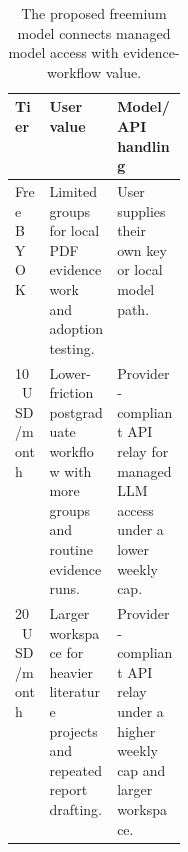 \begin{table}[t]
  \caption{The proposed freemium model connects managed model access with evidence-workflow value.}
  \label{tab:revenue-model}
  \centering
  \small
  \setlength{\tabcolsep}{4pt}
  \begin{tabularx}{\linewidth}{p{0.2\linewidth}YY}
    \toprule
    Tier & User value & Model/API handling \\
    \midrule
    Free BYOK & Limited groups for local PDF evidence work and adoption testing. & User supplies their own key or local model path. \\
    10~USD/month & Lower-friction postgraduate workflow with more groups and routine evidence runs. & Provider-compliant API relay for managed LLM access under a lower weekly cap. \\
    20~USD/month & Larger workspace for heavier literature projects and repeated report drafting. & Provider-compliant API relay under a higher weekly cap and larger workspace. \\
    \bottomrule
  \end{tabularx}
\end{table}
